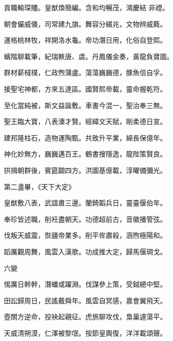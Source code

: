 \begin{pinyinscope}
 貢職輸琛贐。皇猷煥簡編。含和均暢茂，鴻慶結
 非禋。



 朝會儼威儀，司常建九旗。舞容分綴兆，文物辨威蕤。



 運格桃林牧，祥開洛水龜。帝功潛日用，化俗自登熙。



 螭階聊載筆，紀瑞軼唐、虞。丹鳳儀金奏，黃龍負寶圖。



 群材薪棫樸，仁政煦蒲盧。蕩蕩巍巍德，豚魚信自孚。



 接聖宅神都，方來五達區。國賢熙帝載，靈命握乾符。



 至化當純被，斯文益誕敷。車書今混一，聖治奉三無。



 聖王臨大寶，八表湊才賢。經緯文天賦，剛柔德日宣。



 建邦隆柱石，造物運陶甄。共致升平業，綿長保億年。



 神化妙無方，巍巍邁百王。鶴書搜隱逸，龍陛策賢良。



 拱揖朝群後，賓筵闢四方。洪圖基億載，淳曜備彌光。



 第二盞畢，《天下大定》



 皇猷敷八表，武誼肅三邊。蘭錡韜兵日，靈臺偃伯年。



 奉珍皆述職，削衽盡朝天。功德超前古，音徽播管弦。



 伐叛天威震，恢疆帝業多。削平侔肅殺，涵煦極陽和。



 蹈厲觀周舞，風雲入漢歌。功成推大定，歸馬偃琱戈。



 六變



 惕厲日幹幹，潛蟠或躍淵。伐謀參上策，受鉞總中堅。



 田訟歸周日，民謠戴舜年。風雲自冥感，嘉會翼飛天。



 壺關方逆命，投袂起親征。虎旅聊攻伐，梟巢遽蕩平。



 天威清朔漠，仁澤被黎氓。按節皇輿復，洋洋載頌聲。




\end{pinyinscope}
